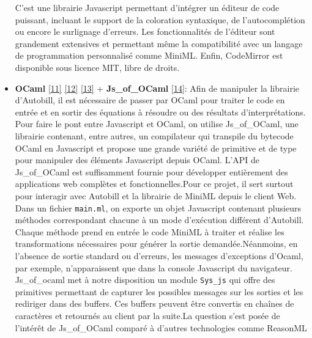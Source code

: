 \documentclass[
  12pt,
]{article}
\begin{document}
\begin{itemize}
        C'est une librairie Javascript permettant d'intégrer un éditeur de
        code puissant, incluant le support de la coloration syntaxique, de
        l'autocomplétion ou encore le surlignage d'erreurs. Les
        fonctionnalités de l'éditeur sont grandement extensives et permettant
        même la compatibilité avec un langage de programmation personnalisé
        comme MiniML. Enfin, CodeMirror est disponible sous licence MIT, libre
        de droits.
  \item
        \textbf{OCaml} \protect\hyperlink{ref-Minsky_Ocaml}{{[}11{]}}
        \protect\hyperlink{ref-chailloux}{{[}12{]}}
        \protect\hyperlink{ref-Leroy}{{[}13{]}} + \textbf{Js\_of\_OCaml}
        \protect\hyperlink{ref-js_of_ocaml}{{[}14{]}}: Afin de manipuler la
        librairie d'Autobill, il est nécessaire de passer par OCaml pour
        traiter le code en entrée et en sortir des équations à résoudre ou des
        résultats d'interprétations. Pour faire le pont entre Javascript et
        OCaml, on utilise Js\_of\_OCaml, une librairie contenant, entre
        autres, un compilateur qui transpile du bytecode OCaml en Javascript
        et propose une grande variété de primitive et de type pour manipuler
        des éléments Javascript depuis OCaml. L'API de Js\_of\_OCaml est
        suffisamment fournie pour développer entièrement des applications web
        complètes et fonctionnelles.\newline  Pour ce projet, il sert surtout
        pour interagir avec Autobill et la librairie de MiniML depuis le
        client Web. Dans un fichier \texttt{main.ml}, on exporte un objet
        Javascript contenant plusieurs méthodes correspondant chacune à un
        mode d'exécution différent d'Autobill. Chaque méthode prend en entrée
        le code MiniML à traiter et réalise les transformations nécessaires
        pour générer la sortie demandée.\newline  Néanmoins, en l'absence de
        sortie standard ou d'erreurs, les messages d'exceptions d'Ocaml, par
        exemple, n'apparaissent que dans la console Javascript du navigateur.
        Js\_of\_ocaml met à notre disposition un module \texttt{Sys\_js} qui
        offre des primitives permettant de capturer les possibles messages sur
        les sorties et les rediriger dans des buffers. Ces buffers peuvent
        être convertis en chaînes de caractères et retournés au client par la
        suite.\newline  La question s'est posée de l'intérêt de Js\_of\_OCaml
        comparé à d'autres technologies comme ReasonML

\end{itemize}
\end{document}
